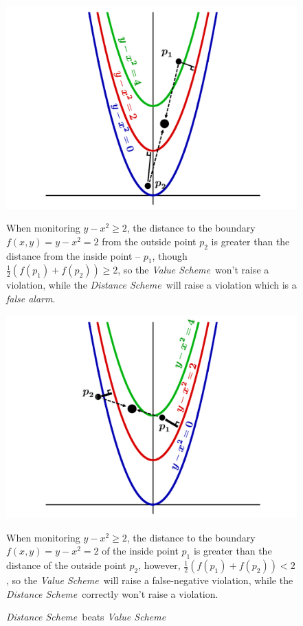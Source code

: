 \documentclass[10pt, conference]{IEEEtran}
\newcommand{\valueScheme}{\textit{Value Scheme}}
\newcommand{\distanceScheme}{\textit{Distance Scheme}}
\newcommand{\falseAlarm}{\textit{false alarm}}
\begin{document}
\begin{figure}[t]
\begin{minipage}[t]{0.49\linewidth}
{\centering
\includegraphics[width=\textwidth]{Pics/PNGs/ValueSchemeBetter.png}
\caption{\valueScheme \ beats \distanceScheme}
\label{fig:valueBeatsDistanceFigure}}
\medskip
\small
When monitoring ${y-x^2 \geq 2}$, the distance to the boundary ${f(x, y) = y - x^2 = 2}$ from the outside point $p_2$ is greater than the distance from the inside point -- $p_1$, though ${\frac{1}{2}(f(p_1)+f(p_2))\geq 2}$, so the \valueScheme \ won't raise a violation, while the \distanceScheme \ will raise a violation which is a \falseAlarm .

\end{minipage}
\begin{minipage}[t]{0.02\linewidth}
\hfill
\end{minipage}
\begin{minipage}[t]{0.49\linewidth}
{\centering
\includegraphics[width=\textwidth]{Pics/PNGs/DistanceSchemeBetter.png}
\caption{\distanceScheme \ beats \valueScheme}
\label{fig:distanceBeatsValueFigure}}
\medskip
\small
When monitoring ${y-x^2 \geq 2}$, the distance to the boundary ${f(x,y) = y - x^2 = 2}$ of the inside point $p_1$ is greater than the distance of the outside point $p_2$, however, ${\frac{1}{2}(f(p_1)+f(p_2))< 2}$, so the \valueScheme \ will raise a false-negative violation, while the \distanceScheme \ correctly won't raise a violation.
\end{minipage}
\end{figure}
\end{document}
